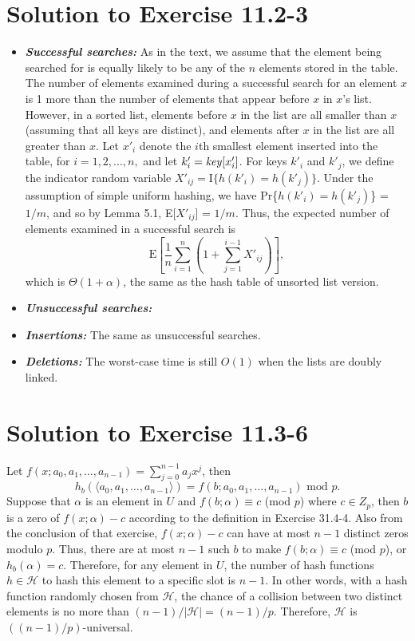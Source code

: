 \documentclass[a4paper, fleqn]{article}
\begin{document}
\section*{Solution to Exercise 11.2-3}
\begin{itemize}
\item
\textbf{\textit{Successful searches:}} As in the text, we assume that
the element being searched for is equally likely to be any of the $n$
elements stored in the table. The number of elements examined during a
successful search for an element $x$ is 1 more than the number of
elements that appear before $x$ in $x$'s list. However, in a sorted
list, elements before $x$ in the list are all smaller than $x$
(assuming that all keys are distinct), and elements after $x$ in the
list are all greater than $x$. Let $x'_i$ denote the $i$th smallest
element inserted into the table, for $i = 1, 2, \ldots, n,$ and let
$k'_i = \id{key}[x'_i]$. For keys $k'_i$ and $k'_j$, we define the
indicator random variable $X'_{ij} = \mbox{I}\{h(k'_i) =
h(k'_j)\}$. Under the assumption of simple uniform hashing, we have
Pr\{$h(k'_i) = h(k'_j)$\} = $1/m$, and so by Lemma 5.1, E[$X'_{ij}$] =
$1/m$. Thus, the expected number of elements examined in a successful
search is
\[
\mbox{E}\left[
\frac{1}{n}\sum_{i=1}^n \left(1 + \sum_{j=1}^{i-1}X'_{ij} \right)
\right],
\]
which is $\Theta(1+\alpha)$, the same as the hash table of unsorted
list version.

\item
\textbf{\textit{Unsuccessful searches:}} 

\item
\textbf{\textit{Insertions:}} The same as unsuccessful searches.

\item
\textbf{\textit{Deletions:}} The worst-case time is still $O(1)$ when
the lists are doubly linked.
\end{itemize}





\section*{Solution to Exercise 11.3-6}

Let $f(x;a_0, a_1, \ldots, a_{n-1}) = \sum_{j=0}^{n-1}a_jx^j$, then
\[
h_b(\langle a_0, a_1, \ldots, a_{n-1} \rangle) = f(b;a_0, a_1,
\ldots, a_{n-1}) \mbox{ mod } p.
\]
Suppose that $\alpha$ is an element in $U$ and $f(b;\alpha) \equiv c$
(mod $p$) where $c \in Z_p$, then $b$ is a zero of $f(x;\alpha) - c$
according to the definition in Exercise 31.4-4. Also from the
conclusion of that exercise, $f(x;\alpha) - c$ can have at most $n-1$
distinct zeros modulo $p$. Thus, there are at most $n-1$ such $b$ to
make $f(b;\alpha) \equiv c$ (mod $p$), or $h_b(\alpha) =
c$. Therefore, for any element in $U$, the number of hash functions $h
\in \mathcal{H}$ to hash this element to a specific slot is $n-1$. In
other words, with a hash function randomly chosen from $\mathcal{H}$,
the chance of a collision between two distinct elements is no more
than $(n-1) / |\mathcal{H}| = (n-1)/p$. Therefore, $\mathcal{H}$ is
$((n-1)/p)$-universal.
\end{document}
